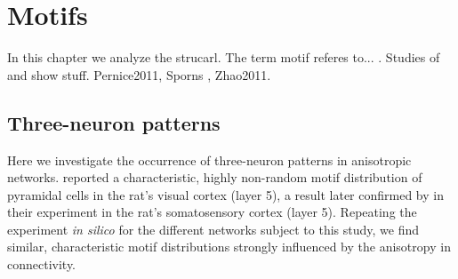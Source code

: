 

\section{Motifs}

In this chapter we analyze the strucarl. The term motif referes
to... . Studies of \textcite{Song2005} and \textcite{Perin2011} show
stuff. Pernice2011, Sporns , Zhao2011.

\newpage
\subsection*{Three-neuron patterns}

Here we investigate the occurrence of three-neuron patterns in
an\-iso\-tro\-pic networks. \textcite{Song2005} reported a
characteristic, highly non-ran\-dom motif distribution of pyramidal
cells in the rat's visual cortex (layer 5), a result later confirmed
by \textcite{Perin2011} in their experiment in the rat's somatosensory
cortex (layer 5). Repeating the experiment \textit{in silico} for the
different networks subject to this study, we find similar,
characteristic motif distributions strongly influenced by the
anisotropy in connectivity.

